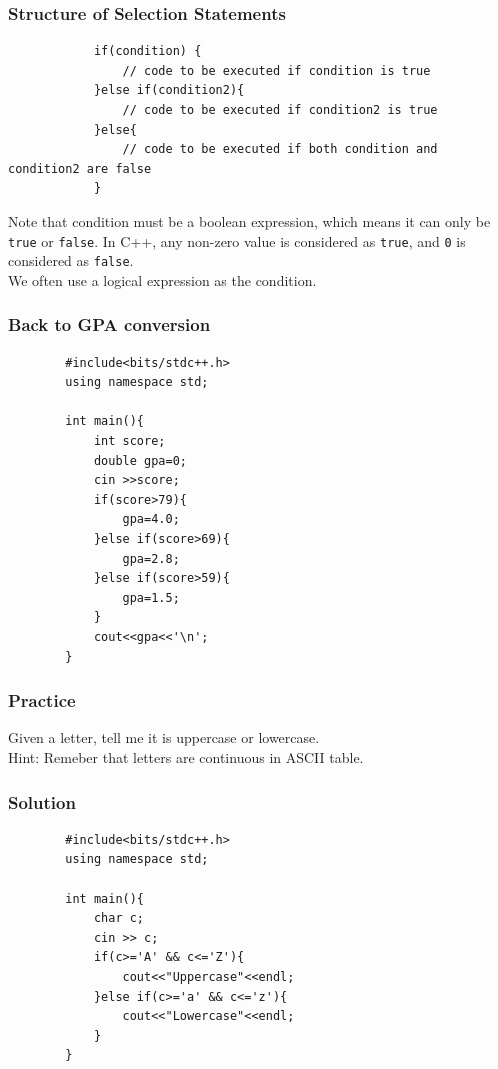 \documentclass[xcolor=dvipsnames]{beamer}
\begin{document}
    \begin{frame}[fragile]
        \frametitle{Structure of Selection Statements}
        \begin{verbatim}
            if(condition) {
                // code to be executed if condition is true
            }else if(condition2){
                // code to be executed if condition2 is true
            }else{
                // code to be executed if both condition and condition2 are false
            }
        \end{verbatim}
        Note that condition must be a boolean expression, which means it can only be \texttt{true} or \texttt{false}.
        In C++, any non-zero value is considered as \texttt{true}, and \texttt{0} is considered as \texttt{false}.\\
        We often use a logical expression as the condition.
    \end{frame}
    \begin{frame}[fragile]
        \frametitle{Back to GPA conversion}
        \begin{verbatim}
        #include<bits/stdc++.h>
        using namespace std;

        int main(){
            int score;
            double gpa=0;
            cin >>score;
            if(score>79){
                gpa=4.0;
            }else if(score>69){
                gpa=2.8;
            }else if(score>59){
                gpa=1.5;
            }
            cout<<gpa<<'\n';
        }            
        \end{verbatim}
    \end{frame}
    \begin{frame}
        \frametitle{Practice}
        Given a letter, tell me it is uppercase or lowercase.\\
        Hint: Remeber that letters are continuous in ASCII table.
    \end{frame}
    \begin{frame}[fragile]
        \frametitle{Solution}
        \begin{verbatim}
        #include<bits/stdc++.h>
        using namespace std;

        int main(){
            char c;
            cin >> c;
            if(c>='A' && c<='Z'){
                cout<<"Uppercase"<<endl;
            }else if(c>='a' && c<='z'){
                cout<<"Lowercase"<<endl;
            }
        }
        \end{verbatim}
    \end{frame}
\end{document}
